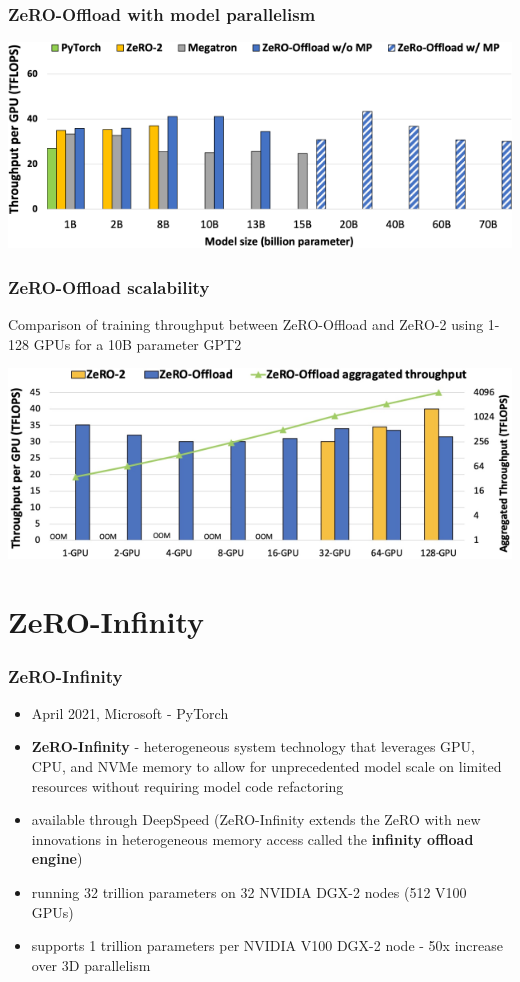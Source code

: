 \documentclass{beamer}
\begin{document}
\begin{frame}
    \frametitle{ZeRO-Offload with model parallelism}
    \begin{center}
        \includegraphics[scale=2.0]{img/zero_offload_max_model.png}
    \end{center}
\end{frame}

\begin{frame}
    \frametitle{ZeRO-Offload scalability}
    Comparison of training throughput between ZeRO-Offload and ZeRO-2 using 1-128 GPUs for a 10B parameter GPT2
    \begin{center}
        \includegraphics[scale=2.0]{img/zero_offload_scalability.png}
    \end{center}
\end{frame}




\section{ZeRO-Infinity}
\begin{frame}
    \frametitle{ZeRO-Infinity \cite{zero_infinity}}
    \begin{itemize}
        \item April 2021, Microsoft - PyTorch
        \item \textbf{ZeRO-Infinity} - heterogeneous system technology that leverages GPU, CPU, and NVMe memory to allow for unprecedented model scale on limited resources without requiring model code refactoring
        \item available through DeepSpeed (ZeRO-Infinity extends the ZeRO with new innovations in heterogeneous memory access called the \textbf{infinity offload engine})
        \item running 32 trillion parameters on 32 NVIDIA DGX-2 nodes (512 V100 GPUs)
        \item supports 1 trillion parameters per NVIDIA V100 DGX-2 node - 50x increase over 3D parallelism
    \end{itemize}
\end{frame}
\end{document}

